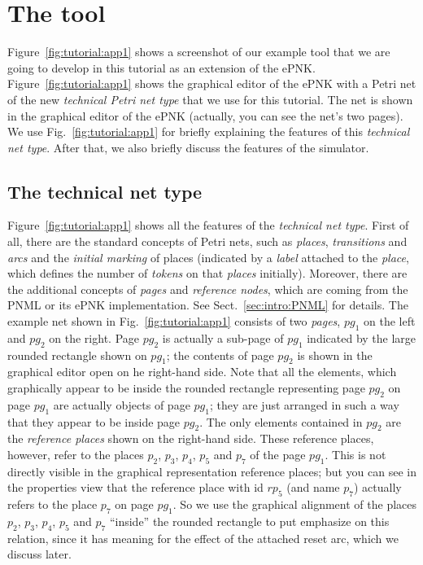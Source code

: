 \section{The tool}
\label{sec:tutorial:tool}

Figure~\ref{fig:tutorial:app1} shows a screenshot of our example tool that we
are going to develop in this tutorial as an extension of the ePNK.
Figure~\ref{fig:tutorial:app1} shows the graphical editor of the ePNK with a
Petri net of the new \emph{technical Petri net type} that we use for this
tutorial. The net is shown in the graphical editor of the ePNK (actually, you
can see the net's two pages). We use Fig.~\ref{fig:tutorial:app1} for briefly
explaining the features of this \emph{technical net type}. After that, we also
briefly discuss the features of the simulator.

\subsection{The technical net type}
\label{sec:tutorial:tool:nettype}

Figure~\ref{fig:tutorial:app1} shows all the features of the \emph{technical net
type}. First of all, there are the standard concepts of Petri nets, such as
\emph{places}, \emph{transitions} and \emph{arcs} and the \emph{initial marking}
of places (indicated by a \emph{label} attached to the \emph{place}, which
defines the number of \emph{tokens} on that \emph{places} initially). Moreover,
there are the additional concepts of \emph{pages} and \emph{reference nodes},
which are coming from the PNML \cite{HKea09} or its ePNK implementation. See
Sect.~\ref{sec:intro:PNML} for details.
The example net shown in Fig.~\ref{fig:tutorial:app1} consists of two
\emph{pages}, $pg_1$ on the left and $pg_2$ on the right. Page $pg_2$ is
actually a sub-page of $pg_1$ indicated by the large rounded rectangle shown on
$pg_1$; the contents of page $pg_2$ is shown in the graphical editor open on he
right-hand side.
Note that all the elements, which graphically appear to be inside the
rounded rectangle representing page $pg_2$ on page $pg_1$ are actually objects
of page $pg_1$; they are just arranged in such a way that they appear to be
inside page $pg_2$. The only elements contained in $pg_2$ are the
\emph{reference places} shown on the right-hand side. These reference
places, however, refer to the places $p_2$, $p_3$, $p_4$, $p_5$ and $p_7$ of the
page $pg_1$.
This is not directly visible in the graphical representation reference places;
but you can see in the properties view that the reference place with id
$rp_5$ (and name $p_7$) actually refers to the place $p_7$ on page $pg_1$. So we
use the graphical alignment of the places $p_2$, $p_3$, $p_4$, $p_5$
and $p_7$ ``inside'' the rounded rectangle to put emphasize on this relation,
since it has meaning for the effect of the attached reset arc, which we discuss
later.

